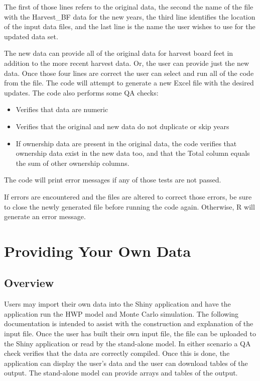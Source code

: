 \documentclass[
]{book}
\begin{document}
The first of those lines refers to the original data, the second the name of the file with the Harvest\_BF data for the new years, the third line identifies the location of the input data files, and the last line is the name the user wishes to use for the updated data set.

The new data can provide all of the original data for harvest board feet in addition to the more recent harvest data. Or, the user can provide just the new data. Once those four lines are correct the user can select and run all of the code from the file. The code will attempt to generate a new Excel file with the desired updates. The code also performs some QA checks:

\begin{itemize}
\item
  Verifies that data are numeric
\item
  Verifies that the original and new data do not duplicate or skip years
\item
  If ownership data are present in the original data, the code verifies that ownership data exist in the new data too, and that the Total column equals the sum of other ownership columns.
\end{itemize}

The code will print error messages if any of those tests are not passed.

If errors are encountered and the files are altered to correct those errors, be sure to close the newly generated file before running the code again. Otherwise, R will generate an error message.

\hypertarget{own}{%
\chapter{Providing Your Own Data}\label{own}}

\hypertarget{own-over}{%
\section{Overview}\label{own-over}}

Users may import their own data into the Shiny application and have the application run the HWP model and Monte Carlo simulation. The following documentation is intended to assist with the construction and explanation of the input file. Once the user has built their own input file, the file can be uploaded to the Shiny application or read by the stand-alone model. In either scenario a QA check verifies that the data are correctly compiled. Once this is done, the application can display the user's data and the user can download tables of the output. The stand-alone model can provide arrays and tables of the output.
\end{document}
